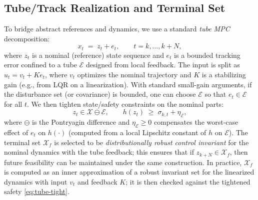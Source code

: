 \documentclass[journal]{IEEEtran}
\theoremstyle{definition}
\begin{document}
\subsection{Tube/Track Realization and Terminal Set}
\label{subsec:tube}
To bridge abstract references and dynamics, we use a standard \emph{tube MPC} decomposition:
\begin{equation}
x_t \;=\; z_t + e_t, \qquad t=k,\dots,k+N,
\label{eq:tube}
\end{equation}
where $z_t$ is a nominal (reference) state sequence and $e_t$ is a bounded tracking error confined to a
tube $\mathcal{E}$ designed from local feedback. The input is split as $u_t = v_t + K e_t$, where $v_t$
optimizes the nominal trajectory and $K$ is a stabilizing gain (e.g., from LQR on a linearization).
With standard small-gain arguments, if the disturbance set (or covariance) is bounded, one can choose
$\mathcal{E}$ so that $e_t\in\mathcal{E}$ for all $t$.
We then tighten state/safety constraints on the nominal parts:
\begin{equation}
z_t \in \mathcal{X}\ominus\mathcal{E},\qquad
h(z_t) \;\ge\; \sigma_{k,t} + \eta_{\mathcal{E}},
\label{eq:tube-tight}
\end{equation}
where $\ominus$ is the Pontryagin difference and $\eta_{\mathcal{E}}\ge 0$ compensates the worst-case
effect of $e_t$ on $h(\cdot)$ (computed from a local Lipschitz constant of $h$ on $\mathcal{E}$).
The terminal set $\mathcal{X}_f$ is selected to be \emph{distributionally robust control invariant}
for the nominal dynamics with the tube feedback; this ensures that if $z_{k+N}\in\mathcal{X}_f$, then
future feasibility can be maintained under the same construction. In practice, $\mathcal{X}_f$ is computed
as an inner approximation of a robust invariant set for the linearized dynamics with input $v_t$ and
feedback $K$; it is then checked against the tightened safety \eqref{eq:tube-tight}.
\end{document}
